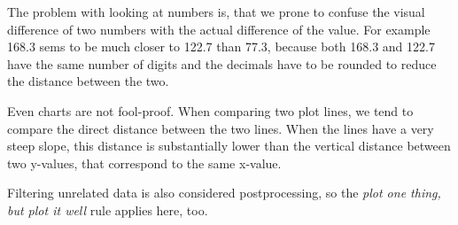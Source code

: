The problem with looking at numbers is, that we prone to confuse the visual difference of two numbers with the actual difference of the value.
For example 168.3 sems to be much closer to 122.7 than 77.3, because both 168.3 and 122.7 have the same number of digits and the decimals have to be rounded to reduce the distance between the two.

Even charts are not fool-proof.
When comparing two plot lines, we tend to compare the direct distance between the two lines.
When the lines have a very steep slope, this distance is substantially lower than the vertical distance between two y-values, that correspond to the same x-value.

Filtering unrelated data is also considered postprocessing, so the \textit{plot one thing, but plot it well} rule applies here, too.

